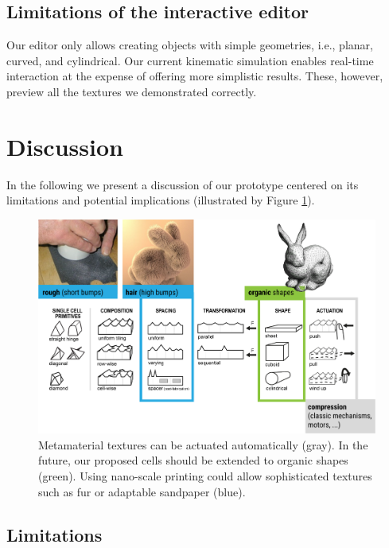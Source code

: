 \subsection{Limitations of the interactive editor}

Our editor only allows creating objects with simple geometries, i.e., planar, curved, and cylindrical. Our current kinematic simulation enables real-time interaction at the expense of offering more simplistic results. These, however, preview all the textures we demonstrated correctly. 




\section{Discussion}

In the following we present a discussion of our prototype centered on its limitations and potential implications (illustrated by Figure \ref{fig:18-discussion}). 

\begin{figure} [h]  
    \includegraphics[width=\textwidth]{chapters/metamaterial-textures-FIG/18-discussion.pdf}
    \caption[Short figure name.]{Metamaterial textures can be actuated automatically (gray). In the future, our proposed cells should be extended to organic shapes (green). Using nano-scale printing could allow sophisticated textures such as fur or adaptable sandpaper (blue). 
    \label{fig:18-discussion}}
\end{figure}


\subsection{Limitations}

